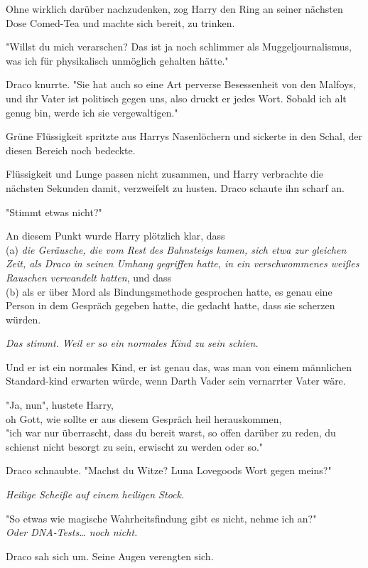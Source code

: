 {Ohne wirklich darüber nachzudenken, zog Harry den Ring an seiner nächsten Dose Comed-Tea und machte sich bereit, zu trinken.

"Willst du mich verarschen? Das ist ja noch schlimmer als Muggeljournalismus, was ich für physikalisch unmöglich gehalten hätte."

Draco knurrte. "Sie hat auch so eine Art perverse Besessenheit von den Malfoys, und ihr Vater ist politisch gegen uns, also druckt er jedes Wort. Sobald ich alt genug bin, werde ich sie vergewaltigen."

Grüne Flüssigkeit spritzte aus Harrys Nasenlöchern und sickerte in den Schal, der diesen Bereich noch bedeckte.

Flüssigkeit und Lunge passen nicht zusammen, und Harry verbrachte die nächsten Sekunden damit, verzweifelt zu husten. Draco schaute ihn scharf an.

"Stimmt etwas nicht?"

An diesem Punkt wurde Harry plötzlich klar, dass\\ (a) \emph{die Geräusche, die vom Rest des Bahnsteigs kamen, sich etwa zur gleichen Zeit, als Draco in seinen Umhang gegriffen hatte, in ein verschwommenes weißes Rauschen verwandelt hatten}, und dass\\ (b) als er über Mord als Bindungsmethode gesprochen hatte, es genau eine Person in dem Gespräch gegeben hatte, die gedacht hatte, dass sie scherzen würden.

\emph{Das stimmt. Weil er so ein normales Kind zu sein schien.}

Und er ist ein normales Kind, er ist genau das, was man von einem männlichen Standard-kind erwarten würde, wenn Darth Vader sein vernarrter Vater wäre.

"Ja, nun", hustete Harry,\\ oh Gott, wie sollte er aus diesem Gespräch heil herauskommen,\\ "ich war nur überrascht, dass du bereit warst, so offen darüber zu reden, du schienst nicht besorgt zu sein, erwischt zu werden oder so."

Draco schnaubte. "Machst du Witze? Luna Lovegoods Wort gegen meins?"

\emph{Heilige Scheiße auf einem heiligen Stock.}

"So etwas wie magische Wahrheitsfindung gibt es nicht, nehme ich an?"\\ \emph{Oder DNA-Tests… noch nicht.}

Draco sah sich um. Seine Augen verengten sich.

}
